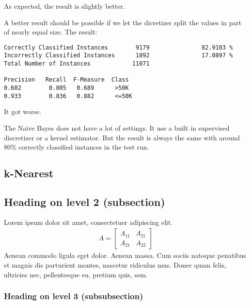 \documentclass[paper=a4, fontsize=11pt]{scrartcl} %
\numberwithin{equation}{section} %
\numberwithin{figure}{section} %
\numberwithin{table}{section} %
\begin{document}
As expected, the result is slightly better.

A better result should be possible if we let the dicretizer split the values in part of nearly equal size. The result:

\begin{verbatim}
Correctly Classified Instances        9179               82.9103 %
Incorrectly Classified Instances      1892               17.0897 %
Total Number of Instances            11071     

Precision   Recall  F-Measure  Class
0.602        0.805   0.689      >50K
0.933        0.836   0.882      <=50K
\end{verbatim}

It got worse. 

The Naive Bayes does not have a lot of settings. It use a built in supervised discretizer or a kernel estimator. But the result is always the same with around 80\% correctly classified instances in the test run.

\subsection{k-Nearest}




\subsection{Heading on level 2 (subsection)}

Lorem ipsum dolor sit amet, consectetuer adipiscing elit. 
\begin{align}
A = 
\begin{bmatrix}
A_{11} & A_{21} \\
A_{21} & A_{22}
\end{bmatrix}
\end{align}
Aenean commodo ligula eget dolor. Aenean massa. Cum sociis natoque penatibus et magnis dis parturient montes, nascetur ridiculus mus. Donec quam felis, ultricies nec, pellentesque eu, pretium quis, sem.


\subsubsection{Heading on level 3 (subsubsection)}
\end{document}
